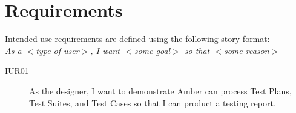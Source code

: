 \newpage
\section{Requirements}
Intended-use requirements are defined using the following story format: \\
\hspace*{1.5cm}\emph{As a $<$type of user$>$, I want $<$some goal$>$ so that $<$some reason$>$}

\begin{description}

\item[IUR01] \quad
As the designer, I want to demonstrate Amber can process Test Plans, Test
Suites, and Test Cases so that I can product a testing report.

\end{description}
